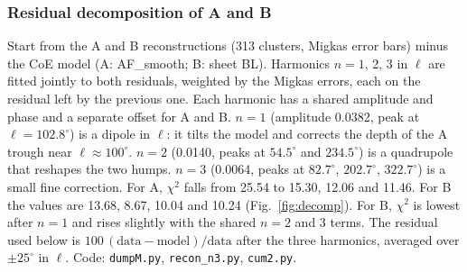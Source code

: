\documentclass[10pt,twocolumn]{article}
\begin{document}
\subsubsection{Residual decomposition of A and B}
Start from the A and B reconstructions (313 clusters, Migkas error bars) minus the CoE model (A: AF\_smooth; B: sheet BL). Harmonics $n=1$, 2, 3 in $\ell$ are fitted jointly to both residuals, weighted by the Migkas errors, each on the residual left by the previous one. Each harmonic has a shared amplitude and phase and a separate offset for A and B. $n=1$ (amplitude 0.0382, peak at $\ell=102.8^\circ$) is a dipole in $\ell$: it tilts the model and corrects the depth of the A trough near $\ell\approx100^\circ$. $n=2$ (0.0140, peaks at $54.5^\circ$ and $234.5^\circ$) is a quadrupole that reshapes the two humps. $n=3$ (0.0064, peaks at $82.7^\circ$, $202.7^\circ$, $322.7^\circ$) is a small fine correction. For A, $\chi^2$ falls from 25.54 to 15.30, 12.06 and 11.46. For B the values are 13.68, 8.67, 10.04 and 10.24 (Fig.~\ref{fig:decomp}). For B, $\chi^2$ is lowest after $n=1$ and rises slightly with the shared $n=2$ and 3 terms. The residual used below is $100\,(\mathrm{data}-\mathrm{model})/\mathrm{data}$ after the three harmonics, averaged over $\pm25^\circ$ in $\ell$. Code: \texttt{dumpM.py}, \texttt{recon\_n3.py}, \texttt{cum2.py}.
\end{document}
